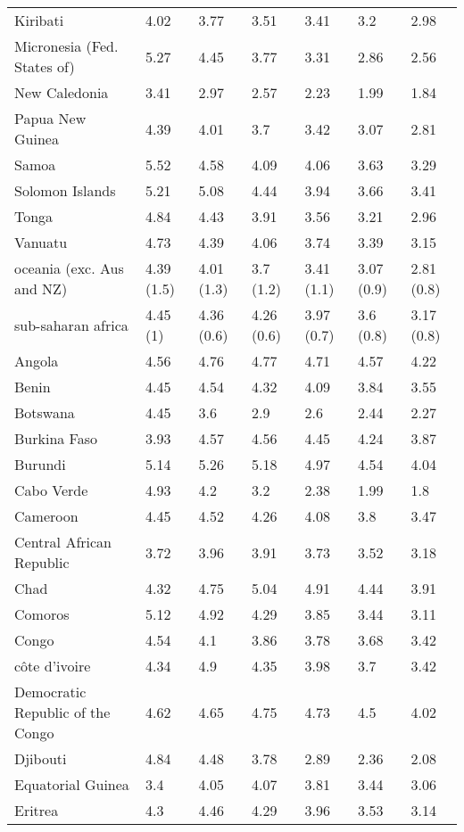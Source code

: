 \begin{longtable}[t]{lllllll}
Kiribati & 4.02 & 3.77 & 3.51 & 3.41 & 3.2 & 2.98\\
\addlinespace
Micronesia (Fed. States of) & 5.27 & 4.45 & 3.77 & 3.31 & 2.86 & 2.56\\
New Caledonia & 3.41 & 2.97 & 2.57 & 2.23 & 1.99 & 1.84\\
Papua New Guinea & 4.39 & 4.01 & 3.7 & 3.42 & 3.07 & 2.81\\
Samoa & 5.52 & 4.58 & 4.09 & 4.06 & 3.63 & 3.29\\
Solomon Islands & 5.21 & 5.08 & 4.44 & 3.94 & 3.66 & 3.41\\
\addlinespace
Tonga & 4.84 & 4.43 & 3.91 & 3.56 & 3.21 & 2.96\\
Vanuatu & 4.73 & 4.39 & 4.06 & 3.74 & 3.39 & 3.15\\
oceania (exc. Aus and NZ) & 4.39 (1.5) & 4.01 (1.3) & 3.7 (1.2) & 3.41 (1.1) & 3.07 (0.9) & 2.81 (0.8)\\
sub-saharan africa & 4.45 (1) & 4.36 (0.6) & 4.26 (0.6) & 3.97 (0.7) & 3.6 (0.8) & 3.17 (0.8)\\
Angola & 4.56 & 4.76 & 4.77 & 4.71 & 4.57 & 4.22\\
\addlinespace
Benin & 4.45 & 4.54 & 4.32 & 4.09 & 3.84 & 3.55\\
Botswana & 4.45 & 3.6 & 2.9 & 2.6 & 2.44 & 2.27\\
Burkina Faso & 3.93 & 4.57 & 4.56 & 4.45 & 4.24 & 3.87\\
Burundi & 5.14 & 5.26 & 5.18 & 4.97 & 4.54 & 4.04\\
Cabo Verde & 4.93 & 4.2 & 3.2 & 2.38 & 1.99 & 1.8\\
\addlinespace
Cameroon & 4.45 & 4.52 & 4.26 & 4.08 & 3.8 & 3.47\\
Central African Republic & 3.72 & 3.96 & 3.91 & 3.73 & 3.52 & 3.18\\
Chad & 4.32 & 4.75 & 5.04 & 4.91 & 4.44 & 3.91\\
Comoros & 5.12 & 4.92 & 4.29 & 3.85 & 3.44 & 3.11\\
Congo & 4.54 & 4.1 & 3.86 & 3.78 & 3.68 & 3.42\\
\addlinespace
côte d'ivoire & 4.34 & 4.9 & 4.35 & 3.98 & 3.7 & 3.42\\
Democratic Republic of the Congo & 4.62 & 4.65 & 4.75 & 4.73 & 4.5 & 4.02\\
Djibouti & 4.84 & 4.48 & 3.78 & 2.89 & 2.36 & 2.08\\
Equatorial Guinea & 3.4 & 4.05 & 4.07 & 3.81 & 3.44 & 3.06\\
Eritrea & 4.3 & 4.46 & 4.29 & 3.96 & 3.53 & 3.14\\

\end{longtable}
